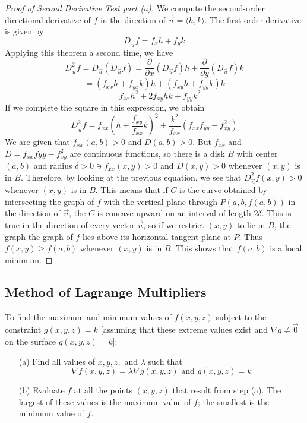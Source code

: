 \documentclass[10pt]{report}
\newcommand{\grad}{\nabla}
\begin{document}
\begin{proof}[Proof of Second Derivative Test part (a)]
We compute the second-order directional derivative of $f$ in the direction of $\vec{u} = \langle h,k \rangle$. The first-order derivative is given by
$$D_{\vec{u}}f=f_xh + f_yk$$
Applying this theorem a second time, we have
$$D_{\vec{u}}^2f=D_{\vec{u}}(D_{\vec{u}}f) = \frac{\partial}{\partial x}(D_{\vec{u}}f)h + \frac{\partial}{\partial y}(D_{\vec{u}}f)k$$
$$=(f_{xx}h + f_{yx}k)h + (f_{xy}h + f_{yy}k)k$$
$$=f_{xx}h^2 + 2f_{xy}hk + f_{yy}k^2$$
If we complete the square in this expression, we obtain
$$D_{\vec{u}}^2f = f_{xx}\left (h+\frac{f_{xy}}{f_{xx}}k\right)^2 + \frac{k^2}{f_{xx}}(f_{xx}f_{yy}-f_{xy}^2)$$
We are given that $f_{xx}(a,b)>0$ and $D(a,b)>0$. But $f_{xx}$ and $D=f_{xx}f{yy}-f_{xy}^2$ are continuous functions, so there is a disk $B$ with center $(a,b)$ and radius $\delta >0\ni f_{xx}(x,y)>0$ and $D(x,y)>0$ whenever $(x,y)$ is in $B$. Therefore, by looking at the previous equation, we see that $D_{\vec{u}}^2f(x,y)>0$ whenever $(x,y)$ is in $B$. This means that if $C$ is the curve obtained by intersecting the graph of $f$ with the vertical plane through $P(a,b,f(a,b))$ in the direction of $\vec{u}$, the $C$ is concave upward on an interval of length $2\delta$. This is true in the direction of every vector $\vec{u}$, so if we restrict $(x,y)$ to lie in $B$, the graph the graph of $f$ lies above its horizontal tangent plane at $P$. Thus $f(x,y)\geq f(a,b)$ whenever $(x,y)$ is in $B$. This shows that $f(a,b)$ is a local minimum.
\end{proof}

\subsection{Method of Lagrange Multipliers}
To find the maximum and minimum values of $f(x,y,z)$ subject to the constraint $g(x,y,z)=k$ [assuming that these extreme values exist and $\grad g\neq \vec{0}$ on the surface $g(x,y,z)=k$]:
\begin{itemize}
\item[(a)] Find all values of $x,y,z,$ and $\lambda$ such that
$$\grad f(x,y,z)=\lambda \grad g(x,y,z)\text{  and  } g(x,y,z)=k$$ 
\item[(b)] Evaluate $f$ at all the points $(x,y,z)$ that result from step (a). The largest of these values is the maximum value of $f$; the smallest is the minimum value of $f$.
\end{itemize}
\end{document}
